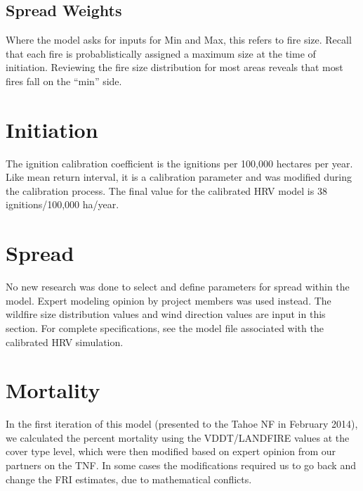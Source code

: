 \subsubsection{}

\subsection{Spread Weights}
Where the model asks for inputs for Min and Max, this refers to fire size. Recall that each fire is probablistically assigned a maximum size at the time of initiation. Reviewing the fire size distribution for most areas reveals that most fires fall on the ``min'' side.

\section{Initiation} The ignition calibration coefficient is the ignitions per 100,000 hectares per year. Like mean return interval, it is a calibration parameter and was modified during the calibration process. The final value for the calibrated HRV model is 38 ignitions/100,000 ha/year.

\section{Spread} No new research was done to select and define parameters for spread within the model. Expert modeling opinion by project members was used instead. The wildfire size distribution values and wind direction values are input in this section. For complete specifications, see the model file associated with the calibrated HRV simulation.

\section{Mortality}
In the first iteration of this model (presented to the Tahoe NF in February 2014), we calculated the percent mortality using the VDDT/LANDFIRE values at the cover type level, which were then modified based on expert opinion from our partners on the TNF. In some cases the modifications required us to go back and change the FRI estimates, due to mathematical conflicts.


